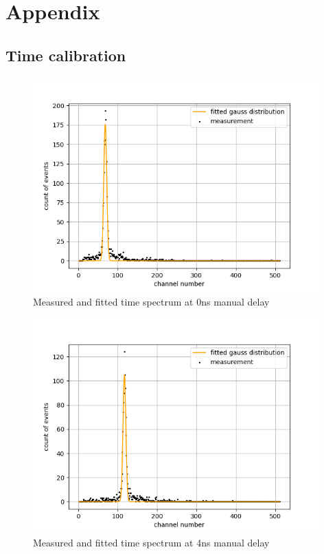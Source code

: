 \chapter{Appendix}
\section{Time calibration}
\label{chap:appendix time calibration}
\begin{figure}[H]
    \centering
    \includegraphics[width=110mm,scale=0.5]{Positronium/include/timecalibration0.png}
    \caption{Measured and fitted time spectrum at 0ns manual delay} 
    
\end{figure}

\begin{figure}[H]
    \centering
    \includegraphics[width=110mm,scale=0.5]{Positronium/include/timecalibration1.png}
    \caption{Measured and fitted time spectrum at 4ns manual delay} 
   
\end{figure}

